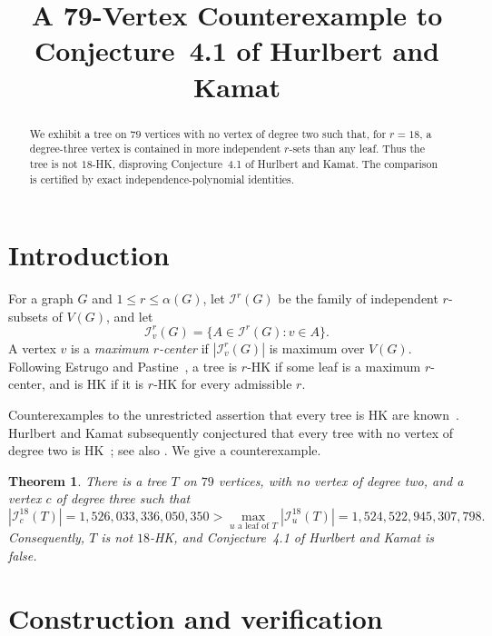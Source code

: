 \documentclass[11pt]{amsart}
\title{A 79-Vertex Counterexample to Conjecture~4.1 of Hurlbert and Kamat}
\date{}
\newtheorem{theorem}{Theorem}
\newcommand{\I}{\mathcal I}
\begin{document}
\begin{abstract}
We exhibit a tree on $79$ vertices with no vertex of degree two such that,
for $r=18$, a degree-three vertex is contained in more independent $r$-sets
than any leaf. Thus the tree is not $18$-HK, disproving Conjecture~4.1 of
Hurlbert and Kamat. The comparison is certified by exact
independence-polynomial identities.
\end{abstract}

\maketitle

\section{Introduction}

For a graph $G$ and $1\le r\le \alpha(G)$, let $\I^r(G)$ be the family of
independent $r$-subsets of $V(G)$, and let
\[
\I_v^r(G)=\{A\in\I^r(G):v\in A\}.
\]
A vertex $v$ is a \emph{maximum $r$-center} if $|\I_v^r(G)|$ is maximum over
$V(G)$. Following Estrugo and Pastine~\cite{EstrugoPastine}, a tree is
$r$-HK if some leaf is a maximum $r$-center, and is HK if it is $r$-HK for
every admissible $r$.

Counterexamples to the unrestricted assertion that every tree is HK are
known~\cite{Borg,FeghaliJohnsonThomas}. Hurlbert and Kamat subsequently
conjectured that every tree with no vertex of degree two is
HK~\cite[Conjecture~4.1]{HurlbertKamat}; see also
\cite[Section~4]{HurlbertSurvey}. We give a counterexample.

\begin{theorem}\label{thm:main}
There is a tree $T$ on $79$ vertices, with no vertex of degree two, and a
vertex $c$ of degree three such that
\[
|\I_c^{18}(T)|
=1{,}526{,}033{,}336{,}050{,}350
>
\max_{u\text{ a leaf of }T}|\I_u^{18}(T)|
=1{,}524{,}522{,}945{,}307{,}798.
\]
Consequently, $T$ is not $18$-HK, and Conjecture~4.1 of Hurlbert and Kamat
is false.
\end{theorem}

\section{Construction and verification}
\end{document}
